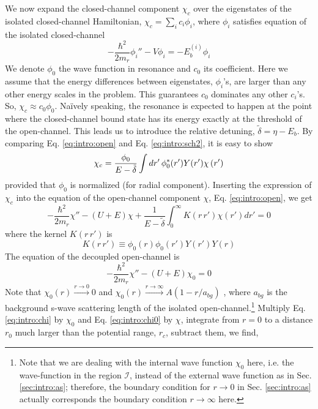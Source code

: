 We now expand the closed-channel component $\chi_{c}$ over the eigenstates of the isolated closed-channel Hamiltonian, $\chi_{c}=\sum_{i}c_{i}\phi_{i}$, where $\phi_{i}$ satisfies \sch equation of the isolated closed-channel
\begin{equation}\label{eq:intro:sch2}
-\frac{\hbar^{2}}{2m_{r}}\phi_{i}''-V \phi_{i}=-E_{b}^{(i)}\phi_{i}
\end{equation}
We denote $\phi_{0}$  the wave function  in resonance and $c_{0}$ its coefficient.  Here we assume that the energy differences between eigenstates, $\phi_{i}$'s, are larger than any other energy scales in the problem.  This guarantees $c_{0}$ dominates any other $c_{i}$'s.  So, $\chi_{c}\approx{}c_{0}\phi_{0}$.  Na\"{i}vely speaking, the resonance is expected to happen at the point where the closed-channel bound state has its energy exactly at the threshold of the open-channel.  This leads us to introduce the relative detuning, $\tilde\delta=\eta-E_{b}$. By comparing Eq. \ref{eq:intro:open} and Eq. \ref{eq:intro:sch2}, it is easy to show 
\begin{equation}\label{eq:intro:closeCoeff}
\chi_{c}=\frac{\phi_{0}}{E-\tilde\delta}\int{dr'}\,\phi_{0}^{*}(r')Y(r')\chi\left(r'\right)
\end{equation}
provided that  $\phi_{0}$ is normalized (for radial component).  Inserting the expression of $\chi_{c}$ into the \sch equation of the open-channel component $\chi$, Eq. \ref{eq:intro:open}, we get 
\begin{equation}\label{eq:intro:chi}
-\frac{\hbar^{2}}{2m_{r}}\chi''-(U+E)\chi+\frac{1}{E-\tilde\delta}\int_{0}^{\infty}K(r\,r')\chi(r')dr'=0
\end{equation}
where the kernel $K(r\,r')$ is
\begin{equation}\label{eq:intro:Krr}
K(r\,r')\equiv\phi_{0}(r)\phi_{0}(r')Y(r')Y(r)
\end{equation}
The  \sch equation of the  decoupled open-channel is
\begin{equation}\label{eq:intro:chi0}
-\frac{\hbar^{2}}{2m_{r}}\chi''-(U+E)\chi_{0}=0
\end{equation}
Note that $\chi_{0}(r)\overset{r\to0}\rightarrow0$ and $\chi_{0}(r)\overset{r\to\infty}\rightarrow{A}(1-r/a_{bg})\label{eq:intro:abg}$ , where $a_{bg}$ is the background s-wave scattering length of the isolated open-channel.\footnote{Note that we are dealing with the internal wave function $\chi_{0}$ here, i.e. the wave-function in the region $\mathcal{I}$, instead of the external wave function as in Sec. \ref{sec:intro:as}; therefore, the boundary condition for $r\rightarrow0$ in Sec. \ref{sec:intro:as} actually corresponds the boundary condition $r\rightarrow\infty$ here.}  Multiply Eq. \ref{eq:intro:chi} by $\chi_{0}$ and Eq. \ref{eq:intro:chi0} by $\chi$, integrate from $r=0$ to a  distance $r_{0}$ much larger than the potential range, $r_{c}$, subtract them, we find,

